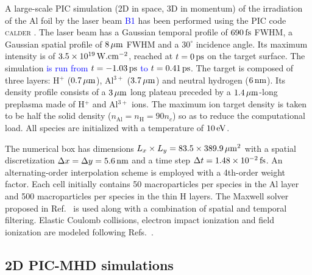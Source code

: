 \documentclass[aps,showpacs,superscriptaddress]{revtex4}
\begin{document}
A large-scale PIC simulation (2D in space, 3D in momentum) of the irradiation of the Al foil by the laser beam \textcolor{blue}{B1} has been performed using the PIC code \textsc{calder} \cite{NF_Lefebvre_2003}. The laser beam has a Gaussian temporal profile of $690\,\rm fs$ FWHM, a Gaussian spatial profile of $8\,\rm \mu m$ FWHM and a $30^\circ$ incidence angle. Its maximum intensity is of $3.5 \times 10^{19}\,\rm W.cm^{-2}$, reached at $t=0\,\rm ps$ on the target surface. The simulation \textcolor{blue}{is run from $t = -1.03\,\rm ps$ to} $t = 0.41\,\rm ps$. The target is composed of three layers: H$^+$ ($0.7\,\rm \mu m$), Al$^{3+}$ ($3.7\,\rm \mu m$) and neutral hydrogen ($6\,\rm nm$). Its density profile consists of a $3\,\rm \mu m$ long plateau preceded by a $1.4\,\rm \mu m$-long preplasma made of H$^+$ and Al$^{3+}$ ions. The maximum ion target density is taken to be half the solid density ($n_\mathrm{Al}=n_\mathrm{H}=90 n_c$) so as to reduce the computational load. All species are initialized with a temperature of $10\,\rm eV$.

The numerical box has dimensions $L_x \times L_y = 83.5 \times 389.9\,\rm \mu m^2$ with a spatial discretization $\Delta x = \Delta y = 5.6\,\rm nm$ and a time step $\Delta t = 1.48\times 10^{-2}\,\rm fs$. An alternating-order interpolation scheme \cite{CPC_Sokolov_2013} is employed with a 4th-order weight factor. Each cell initially contains 50 macroparticles per species in the Al layer and 500 macroparticles per species in the thin H layers. The Maxwell solver proposed in Ref.~\cite{PRSTAB_Lehe_2013} is used along with a combination of spatial \cite{JCP_Vay_2011} and temporal \cite{JCP_Friedman_1990} filtering. Elastic Coulomb collisions, electron impact ionization and field ionization are modeled following Refs.~\cite{POP_Perez_2012}.

\subsection*{2D PIC-MHD simulations}
\end{document}
